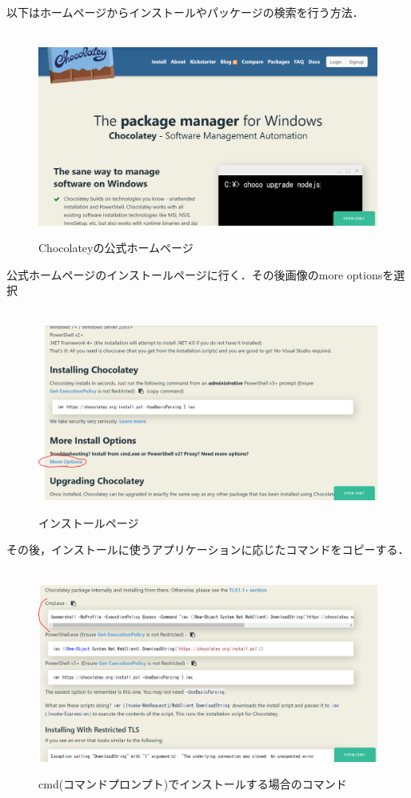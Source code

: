 以下はホームページからインストールやパッケージの検索を行う方法．

\begin{figure}[htbp]
\centering　
\includegraphics[width=13cm]{choco1.png}
\caption{Chocolateyの公式ホームページ}
\end{figure}

公式ホームページのインストールページに行く．その後画像のmore optionsを選択

\begin{figure}[htbp]
\centering　
\includegraphics[width=13cm]{choco2.png}
\caption{インストールページ}
\end{figure}

その後，インストールに使うアプリケーションに応じたコマンドをコピーする．
\begin{figure}[htbp]
\centering　
\includegraphics[width=13cm]{choco3.png}
\caption{cmd(コマンドプロンプト)でインストールする場合のコマンド}
\end{figure}

